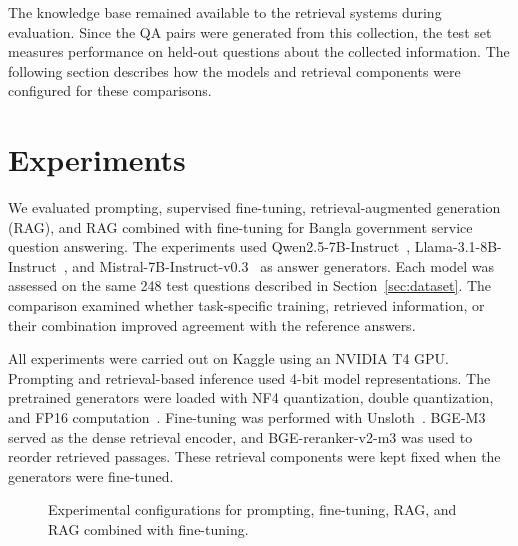 \documentclass[10pt,journal,compsoc]{IEEEtran}
\begin{document}
The knowledge base remained available to the retrieval systems during evaluation. Since the QA pairs were generated from this collection, the test set measures performance on held-out questions about the collected information. The following section describes how the models and retrieval components were configured for these comparisons.

\section{Experiments}
\label{sec:experiments}
\label{sec:Proposed Methodology}
\label{sec:Experimental Setup}

We evaluated prompting, supervised fine-tuning, retrieval-augmented generation (RAG), and RAG combined with fine-tuning for Bangla government service question answering. The experiments used Qwen2.5-7B-Instruct~\cite{yang2024qwen25}, Llama-3.1-8B-Instruct~\cite{grattafiori2024llama3}, and Mistral-7B-Instruct-v0.3~\cite{jiang2023mistral} as answer generators. Each model was assessed on the same 248 test questions described in Section~\ref{sec:dataset}. The comparison examined whether task-specific training, retrieved information, or their combination improved agreement with the reference answers.

All experiments were carried out on Kaggle using an NVIDIA T4 GPU. Prompting and retrieval-based inference used 4-bit model representations. The pretrained generators were loaded with NF4 quantization, double quantization, and FP16 computation~\cite{meth_dettmers2023qlora}. Fine-tuning was performed with Unsloth~\cite{meth_unsloth2023}. BGE-M3 served as the dense retrieval encoder, and BGE-reranker-v2-m3 was used to reorder retrieved passages. These retrieval components were kept fixed when the generators were fine-tuned.

\begin{figure}[!t]
\centering
\caption{Experimental configurations for prompting, fine-tuning, RAG, and RAG combined with fine-tuning.}
\label{fig:experiments}
\end{figure}
\end{document}
